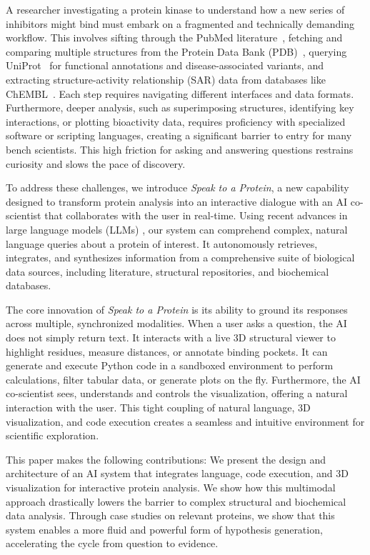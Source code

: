 \documentclass{article}
\begin{document}
A researcher investigating a protein kinase to understand how a new series of inhibitors might bind must embark on a fragmented and technically demanding workflow. This involves sifting through the PubMed literature~\citep{Sayers2020}, fetching and comparing multiple structures from the Protein Data Bank (PDB)~\citep{Burley2018}, querying UniProt~\citep{UniProt2022}  for functional annotations and disease-associated variants, and extracting structure-activity relationship (SAR) data from databases like ChEMBL~\citep{Mendez2018}. Each step requires navigating different interfaces and data formats. Furthermore, deeper analysis, such as superimposing structures, identifying key interactions, or plotting bioactivity data, requires proficiency with specialized software or scripting languages, creating a significant barrier to entry for many bench scientists. This high friction for asking and answering questions restrains curiosity and slows the pace of discovery.

To address these challenges, we introduce \emph{Speak to a Protein}, a new capability 
designed to transform protein analysis into an interactive dialogue with an AI co-scientist that collaborates with the user in real-time. Using recent advances in large language models (LLMs) \citep{achiam2023gpt}, our system can comprehend complex, natural language queries about a protein of interest. It autonomously retrieves, integrates, and synthesizes information from a comprehensive suite of biological data sources, including literature, structural repositories, and biochemical databases.

The core innovation of \emph{Speak to a Protein} is its ability to ground its responses across multiple, synchronized modalities. When a user asks a question, the AI does not simply return text. It interacts with a live 3D structural viewer to highlight residues, measure distances, or annotate binding pockets. It can generate and execute Python code in a sandboxed environment to perform calculations, filter tabular data, or generate plots on the fly. Furthermore, the AI co-scientist sees, understands and controls the visualization, offering a natural interaction with the user. This tight coupling of natural language, 3D visualization, and code execution creates a seamless and intuitive environment for scientific exploration. 

This paper makes the following contributions: We present the design and architecture of an AI system that integrates language, code execution, and 3D visualization for interactive protein analysis. We show how this multimodal approach drastically lowers the barrier to complex structural and biochemical data analysis. Through case studies on relevant proteins, we show that this system enables a more fluid and powerful form of hypothesis generation, accelerating the cycle from question to evidence.
\end{document}
